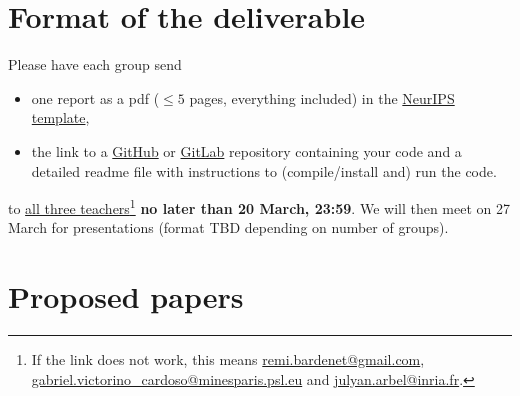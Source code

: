 \documentclass[12pt]{article}%
\begin{document}
\section{Format of the deliverable}
Please have each group send
\begin{itemize}
\item one report as a pdf ($\leq 5$ pages, everything included) in the \href{https://www.overleaf.com/latex/templates/neurips-2020/mnshsmqkjsqz}{NeurIPS template},
\item the link to a \href{https://github.com/}{GitHub} or \href{https://about.gitlab.com/}{GitLab} repository containing your code and a detailed readme file with instructions to (compile/install and) run the code.
\end{itemize} to \href{mailto:remi.bardenet@gmail.com,gabriel.victorino_cardoso@minesparis.psl.eu,julyan.arbel@inria.fr}{all three teachers}\footnote{If the link does not work, this means
\href{mailto:remi.bardenet@gmail.com}{remi.bardenet@gmail.com}, \href{mailto:gabriel.victorino_cardoso@minesparis.psl.eu}{gabriel.victorino\_cardoso@minesparis.psl.eu} and \href{mailto:julyan.arbel@inria.fr}{julyan.arbel@inria.fr}.} {\bf no later than 20 March, 23:59}. 
We will then meet on 27 March for presentations (format TBD depending on number of groups).

\section{Proposed papers}
\label{s:papers}



\end{document}
